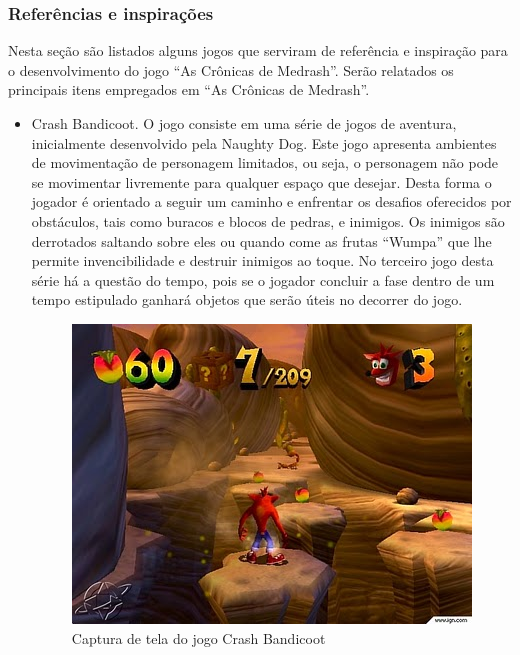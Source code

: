 \subsubsection{Referências e inspirações}
Nesta seção são listados alguns jogos que serviram de referência e inspiração 
para o desenvolvimento do jogo ``As Crônicas de Medrash''. Serão relatados os principais 
itens empregados em ``As Crônicas de Medrash''.

\begin{itemize}
\item Crash Bandicoot.
O jogo consiste 
em uma série de jogos de aventura, inicialmente desenvolvido pela Naughty Dog.
Este jogo apresenta ambientes de movimentação de personagem limitados, ou seja, 
o personagem não pode se movimentar livremente para qualquer espaço que desejar.
 Desta forma o jogador é orientado a seguir um caminho e enfrentar os desafios 
oferecidos por obstáculos, tais como buracos e blocos de pedras, e inimigos.
Os inimigos são derrotados saltando sobre eles ou quando come as frutas ``Wumpa'' que lhe 
permite invencibilidade e destruir inimigos ao toque.
No terceiro jogo desta série há a questão do tempo, pois se o jogador concluir a fase
 dentro de um tempo estipulado ganhará objetos que serão úteis no decorrer do jogo.

\begin{figure}[!ht]
 \centering
 \includegraphics[scale=0.8]{Imagens/crash1.png}
 \caption{Captura de tela do jogo Crash Bandicoot}
 \label{img:crash1}
\end{figure}


\end{itemize}
